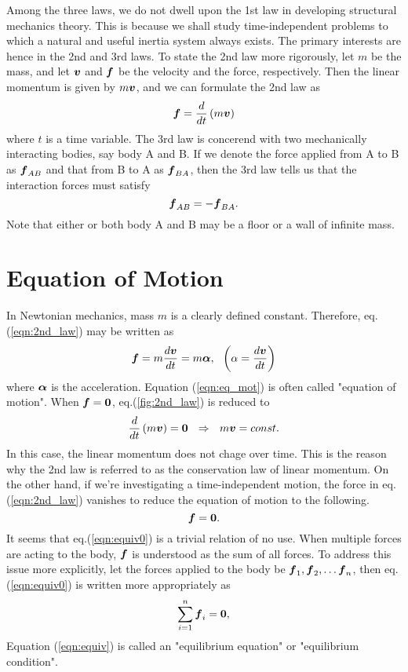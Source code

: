 \documentclass[10pt,a4j]{article}
\begin{document}
Among the three laws, we do not dwell upon the 1st law in developing structural mechanics theory. This is because we shall study time-independent problems to which a natural and useful inertia system always exists. The primary interests are hence in the 2nd and 3rd laws. To state the 2nd law more rigorously, let $m$ be the mass, and let $\mbox{\boldmath $v$}$ and $\mbox{\boldmath $f$}$ be the velocity and the force, respectively. Then the linear momentum is given by $m\mbox{\boldmath $v$}$, and we can formulate the 2nd law as 
\begin{equation}
    \mbox{\boldmath $f$}=\frac{d}{dt}\left(m\mbox{\boldmath $v$}\right)
    \label{eqn:2nd_law}
\end{equation}
where $t$ is a time variable. The 3rd law is concerend with two mechanically interacting bodies, say body A and B. If we denote the force applied from A to B as $\mbox{\boldmath $f$}_{AB}$ and that from B to A as $\mbox{\boldmath $f$}_{BA}$, then the 3rd law tells us that the interaction forces must satisfy  
\begin{equation}
    \mbox{\boldmath $f$}_{AB}=-\mbox{\boldmath $f$}_{BA}.
    \label{eqn:3rd_law}
\end{equation}
Note that either or both body A and B may be a floor or a wall of infinite mass. 
\section{Equation of Motion}
In Newtonian mechanics, mass $m$ is a clearly defined constant. 
Therefore, eq.(\ref{eqn:2nd_law}) may be written as 
\begin{equation}
    \fat{f}=m \frac{d\fat{v}}{dt}=m\fat{\alpha}, \ \ \left(\alpha=\frac{d\fat{v}}{dt}\right)
    \label{eqn:eq_mot}
\end{equation}
where $\mbox{\boldmath $\alpha$}$ is the acceleration. Equation (\ref{eqn:eq_mot}) is often called "equation of motion". When $\mbox{\boldmath $f$}=\mbox{\boldmath $0$}$, eq.(\ref{fig:2nd_law}) is reduced to \begin{equation}
    \frac{d}{dt}\left(m\fat{v}\right)=\fat{0} \ \ \Rightarrow \ \ 
    m\fat{v}=const.
    \label{eqn:mv_cnst}
\end{equation}
In this case, the linear momentum does not chage over time. 
This is the reason why the 2nd law is referred to as the conservation law of linear momentum. On the other hand, if we're investigating a time-independent motion, the force in eq.(\ref{eqn:2nd_law}) vanishes to reduce the equation of motion to the following. 
\begin{equation}
    \mbox{\boldmath $f$}=\mbox{\boldmath $0$}.
    \label{eqn:equiv0}
\end{equation}
It seems that eq.(\ref{eqn:equiv0}) is a trivial relation of no use. 
When multiple forces are acting to the body, $\mbox{\boldmath $f$}$ is understood as the sum of all forces. To address this issue more explicitly, let the forces applied to the body be $\mbox{\boldmath $f$}_1, \mbox{\boldmath $f$}_2,\dots \mbox{\boldmath $f$}_n$, then eq.(\ref{eqn:equiv0}) is written more appropriately as 
\begin{equation}
    \sum_{i=1}^n\mbox{\boldmath $f$}_i=\mbox{\boldmath $0$},
    \label{eqn:equiv}
\end{equation}
Equation (\ref{eqn:equiv}) is called an "equilibrium equation" or "equilibrium condition". 
\end{document}
